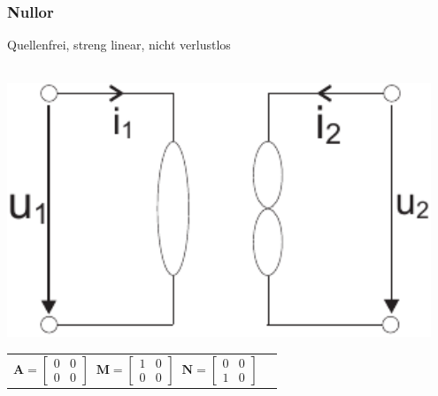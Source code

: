 \documentclass[a4paper,twocolumn,10pt]{article}
\begin{document}
\subsubsection*{Nullor}
Quellenfrei, streng linear, nicht verlustlos\\\\
\begin{minipage}[b]{0.13\textwidth}
\includegraphics[width=0.95\textwidth]{img/OP_Nullor}
\end{minipage}
\hfill
\begin{minipage}[b]{0.33\textwidth}
\begin{tabular}{ll}
$\textbf{A}=\begin{bmatrix}0 & 0\\ 0 & 0\end{bmatrix}\;\;\textbf{M}=\begin{bmatrix}1 & 0\\ 0 & 0\end{bmatrix}\;\;\textbf{N}=\begin{bmatrix}0 & 0\\ 1 & 0\end{bmatrix}$
\end{tabular}\\
\end{minipage}
\end{document}

